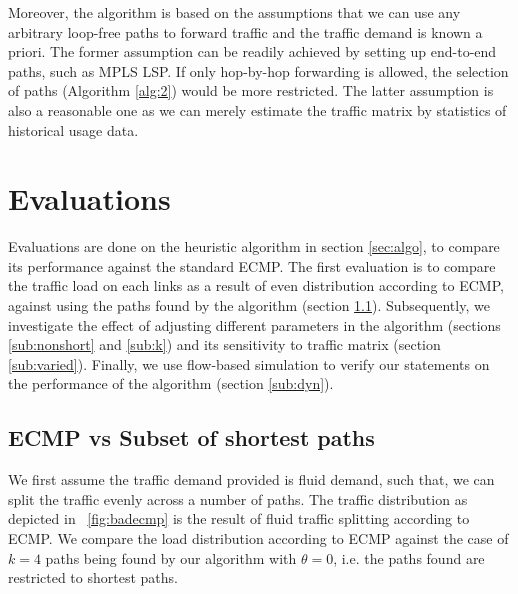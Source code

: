\documentclass[conference]{IEEEtran}
\begin{document}
Moreover, the algorithm is based on the assumptions that we can use any
arbitrary loop-free paths to forward traffic and the traffic demand is known a
priori. The former assumption can be readily achieved by setting up end-to-end
paths, such as MPLS LSP. If only hop-by-hop forwarding is allowed, the
selection of paths (Algorithm \ref{alg:2}) would be more restricted. The latter
assumption is also a reasonable one as we can merely estimate the traffic
matrix by statistics of historical usage data.

\section{Evaluations}\label{sec:eval}

Evaluations are done on the heuristic algorithm in section \ref{sec:algo}, to
compare its performance against the standard ECMP. The first evaluation is to
compare the traffic load on each links as a result of even distribution
according to ECMP, against using the paths found by the algorithm (section
\ref{sub:subset}).  Subsequently, we investigate the effect of adjusting
different parameters in the algorithm (sections \ref{sub:nonshort} and
\ref{sub:k}) and its sensitivity to traffic matrix (section \ref{sub:varied}).
Finally, we use flow-based simulation to verify our statements on the
performance of the algorithm (section \ref{sub:dyn}).

\subsection{ECMP vs Subset of shortest paths}\label{sub:subset}

We first assume the traffic demand provided is fluid demand, such that, we
can split the traffic evenly across a number of paths. The traffic distribution
as depicted in \figurename~\ref{fig:badecmp} is the result of fluid traffic
splitting according to ECMP. We compare the load distribution according to ECMP
against the case of $k=4$ paths being found by our algorithm with $\theta=0$,
i.e. the paths found are restricted to shortest paths.

\begin{figure*}
\caption{Relative load of links in  irregular topology 1,
 irregular topology 2,  fat tree
XGFT(2;3,6;3,3), and  fat tree XGFT(2;5,10;5,5)}\label{fig:const}
\end{figure*}
\end{document}
